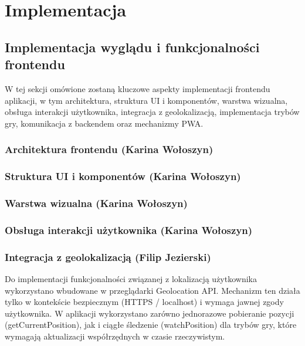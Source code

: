 \chapter{Implementacja}
\label{chap:implementation}
\section{Implementacja wyglądu i funkcjonalności frontendu}
W tej sekcji omówione zostaną kluczowe aspekty implementacji frontendu aplikacji, w tym architektura, struktura UI i komponentów, warstwa wizualna, obsługa interakcji użytkownika, integracja z geolokalizacją, implementacja trybów gry, komunikacja z backendem oraz mechanizmy PWA.

\subsection{Architektura frontendu (Karina Wołoszyn)}

\subsection{Struktura UI i komponentów (Karina Wołoszyn)}

\subsection{Warstwa wizualna (Karina Wołoszyn)}

\subsection{Obsługa interakcji użytkownika (Karina Wołoszyn)}

\subsection{Integracja z geolokalizacją (Filip Jezierski)}

Do implementacji funkcjonalności związanej z lokalizacją użytkownika wykorzystano wbudowane w przeglądarki Geolocation API. Mechanizm ten działa tylko w kontekście bezpiecznym (HTTPS / localhost) i wymaga jawnej zgody użytkownika. W aplikacji wykorzystano zarówno jednorazowe pobieranie pozycji (getCurrentPosition), jak i ciągłe śledzenie (watchPosition) dla trybów gry, które wymagają aktualizacji współrzędnych w czasie rzeczywistym.


